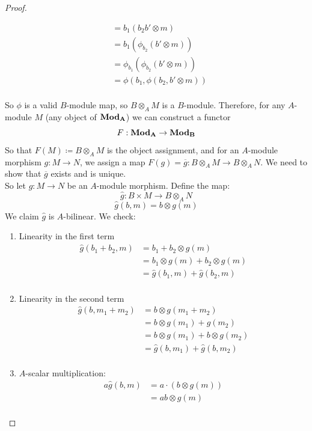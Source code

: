 \documentclass[hidelinks,12pt]{article}
\newcommand{\catname}[1]{{\normalfont\mathbf{#1}}}
\begin{document}
\begin{enumerate}[label=(\alph*).]
\begin{proof}
\begin{enumerate}[label=(\roman*).]
\begin{align*}
        &=b_{1}(b_{2}b'\otimes m)\\
        &=b_{1}(\phi_{b_{2}}(b'\otimes m))\\
        &=\phi_{b_{1}}(\phi_{b_{2}}(b'\otimes m))\\
        &=\phi(b_{1},\phi(b_{2},b'\otimes m))\\
        \end{align*}
\end{enumerate}
So \(\phi\) is a valid \(B\)-module map, so \(B\otimes_{A}M\) is a \(B\)-module. Therefore, for any \(A\)-module \(M\) (any object of \(\catname{Mod_{A}}\)) we can construct a functor \[
    F:\catname{Mod_{A}}\to\catname{Mod_{B}}
\]
So that \(F(M)\coloneqq B\otimes_{A}M\) is the object assignment, and for an \(A\)-module morphism \(g:M\to N\), we assign a map \(F(g)=\overline{g}:B\otimes_{A}M\to B\otimes_{A}N\). We need to show that \(\overline{g}\) exists and is unique.\\
So let \(g:M\to N\) be an \(A\)-module morphism. Define the map: \[
    \hat{g}:B\times M\to B\otimes_{A}N
\]
\[
    \hat{g}(b,m)=b\otimes g(m)
\]
We claim \(\hat{g}\) is \(A\)-bilinear. We check:
\begin{enumerate}[label=(\roman*).]
    \item Linearity in the first term
       \begin{align*}
           \hat{g}(b_{1}+b_{2},m)&=b_{1}+b_{2}\otimes g(m)\\
       &=b_{1}\otimes g(m)+b_{2}\otimes g(m)\\
       &=\hat{g}(b_{1},m)+\hat{g}(b_{2},m)\\
       \end{align*} 
    \item Linearity in the second term
        \begin{align*}
            \hat{g}(b,m_{1}+m_{2})&=b\otimes g(m_{1}+m_{2})\\
                                  &=b\otimes g(m_{1})+g(m_{2})\tag{By linearity of \(g\)}\\
        &=b\otimes g(m_{1})+b\otimes g(m_{2})\\
        &=\hat{g}(b,m_{1})+\hat{g}(b,m_{2})\\
        \end{align*}
    \item \(A\)-scalar multiplication:
        \begin{align*}
            a\hat{g}(b,m)&=a\cdot(b\otimes g(m))\\
        &=ab\otimes g(m)\\

\end{align*}
\end{enumerate}
\end{proof}
\end{enumerate}
\end{document}
